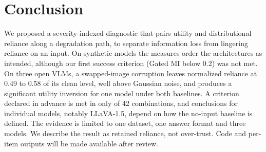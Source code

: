 \section{Conclusion}
\label{sec:conclusion}

We proposed a severity-indexed diagnostic that pairs utility and
distributional reliance along a degradation path, to separate information
loss from lingering reliance on an input. On synthetic models the measures
order the architectures as intended, although our first success criterion
(Gated MI below 0.2) was not met. On three open VLMs, a swapped-image
corruption leaves normalized reliance at 0.49 to 0.58 of its clean level,
well above Gaussian noise, and produces a significant utility inversion for
one model under both baselines. A criterion declared in advance is met in
only  of 42 combinations, and
conclusions for individual models, notably LLaVA-1.5, depend on how the
no-input baseline is defined. The evidence is limited to one dataset, one
answer format and three models. We describe the result as retained
reliance, not over-trust.
Code and per-item outputs will be made available after review.

